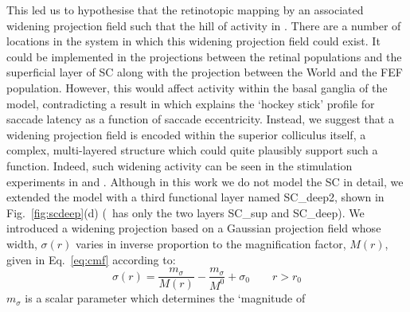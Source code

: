 \documentclass{frontiersSCNS}
\begin{document}
This led us to hypothesise that the retinotopic mapping  by an associated widening projection field such that
the hill of activity in . There are a number of
locations in the system in which this widening projection field could
exist. It could be implemented in the projections between the retinal
populations and the superficial layer of SC along with the projection
between the World and the FEF population. However, this would affect
activity within the basal ganglia of the model, contradicting a result
in \cite{cope_basal_2017} which explains the `hockey stick' profile
for saccade latency as a function of saccade eccentricity. Instead, we
suggest that a widening projection field is encoded within the
superior colliculus itself, a complex, multi-layered structure which
could quite plausibly support such a function. Indeed, such widening
activity can be seen in the stimulation experiments
in \cite{vokoun_intralaminar_2010} and \cite{vokoun_response_2014}.
%
%
Although in this work we do not model
the SC in detail, we extended the model with a third functional layer
named SC\_deep2, shown in Fig.~\ref{fig:scdeep}(d) (\ccg~has only the two
layers SC\_sup and SC\_deep). We introduced a widening projection
based on a Gaussian projection field whose width, $\sigma(r)$ varies
in inverse proportion to the magnification factor, $M(r)$, given in
Eq.~\ref{eq:cmf} according to:
\begin{equation} \label{eq:sigmar}
\sigma(r) = \frac{m_{\sigma}}{M(r)} - \frac{m_{\sigma}}{M^0} + \sigma_0 \qquad r > r_0
\end{equation}
$m_{\sigma}$ is a scalar parameter which determines the `magnitude of
\end{document}
